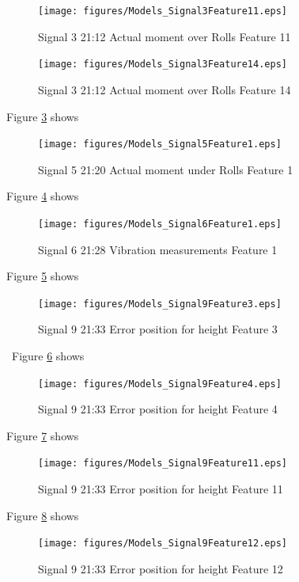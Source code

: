 \documentclass[]{article}
\begin{document}
\begin{figure}[H]
    \centering
    \texttt{[image: figures/Models\_Signal3Feature11.eps]}
    \caption{Signal 3 21:12 Actual moment over Rolls Feature 11}
    \label{fig:Models_Signal3Feature11}
\end{figure}
 
\begin{figure}[H]
    \centering
    \texttt{[image: figures/Models\_Signal3Feature14.eps]}
    \caption{Signal 3 21:12 Actual moment over Rolls Feature 14}
    \label{fig:Models_Signal3Feature14}
\end{figure}


Figure \ref{fig:Models_Signal5Feature1} shows 
\begin{figure}[H]
    \centering
    \texttt{[image: figures/Models\_Signal5Feature1.eps]}
    \caption{Signal 5 21:20 Actual moment under Rolls Feature 1}
    \label{fig:Models_Signal5Feature1}
\end{figure}



Figure \ref{fig:Models_Signal6Feature1} shows 
\begin{figure}[H]
    \centering
    \texttt{[image: figures/Models\_Signal6Feature1.eps]}
    \caption{Signal 6 21:28 Vibration measurements Feature 1}
    \label{fig:Models_Signal6Feature1}
\end{figure}


Figure \ref{fig:Models_Signal9Feature3} shows 
\begin{figure}[H]
    \centering
    \texttt{[image: figures/Models\_Signal9Feature3.eps]}
    \caption{Signal 9 21:33 Error position for height Feature 3}
    \label{fig:Models_Signal9Feature3}
\end{figure}\
Figure \ref{fig:Models_Signal9Feature4} shows 
\begin{figure}[H]
    \centering
    \texttt{[image: figures/Models\_Signal9Feature4.eps]}
    \caption{Signal 9 21:33 Error position for height Feature 4}
    \label{fig:Models_Signal9Feature4}
\end{figure}
Figure \ref{fig:Models_Signal9Feature11} shows 
\begin{figure}[H]
    \centering
    \texttt{[image: figures/Models\_Signal9Feature11.eps]}
    \caption{Signal 9 21:33 Error position for height Feature 11}
    \label{fig:Models_Signal9Feature11}
\end{figure}
Figure \ref{fig:Models_Signal9Feature12} shows 
\begin{figure}[H]
    \centering
    \texttt{[image: figures/Models\_Signal9Feature12.eps]}
    \caption{Signal 9 21:33 Error position for height Feature 12}
    \label{fig:Models_Signal9Feature12}
\end{figure}
\end{document}
